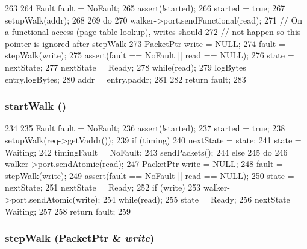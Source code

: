 \begin{DoxyCode}
263 {
264     Fault fault = NoFault;
265     assert(!started);
266     started = true;
267     setupWalk(addr);
268 
269     do {
270         walker->port.sendFunctional(read);
271         // On a functional access (page table lookup), writes should
272         // not happen so this pointer is ignored after stepWalk
273         PacketPtr write = NULL;
274         fault = stepWalk(write);
275         assert(fault == NoFault || read == NULL);
276         state = nextState;
277         nextState = Ready;
278     } while(read);
279     logBytes = entry.logBytes;
280     addr = entry.paddr;
281 
282     return fault;
283 }
\end{DoxyCode}
\hypertarget{classX86ISA_1_1Walker_1_1WalkerState_abe41f563c4251c8a075c343d770369ac}{
\subsubsection[{startWalk}]{ startWalk ()}}
\label{classX86ISA_1_1Walker_1_1WalkerState_abe41f563c4251c8a075c343d770369ac}



\begin{DoxyCode}
234 {
235     Fault fault = NoFault;
236     assert(!started);
237     started = true;
238     setupWalk(req->getVaddr());
239     if (timing) {
240         nextState = state;
241         state = Waiting;
242         timingFault = NoFault;
243         sendPackets();
244     } else {
245         do {
246             walker->port.sendAtomic(read);
247             PacketPtr write = NULL;
248             fault = stepWalk(write);
249             assert(fault == NoFault || read == NULL);
250             state = nextState;
251             nextState = Ready;
252             if (write)
253                 walker->port.sendAtomic(write);
254         } while(read);
255         state = Ready;
256         nextState = Waiting;
257     }
258     return fault;
259 }
\end{DoxyCode}
\hypertarget{classX86ISA_1_1Walker_1_1WalkerState_a5c46b5cda98378cdb854f6810ee91f8a}{
\subsubsection[{stepWalk}]{ stepWalk ({\bf PacketPtr} \& {\em write})}}
\label{classX86ISA_1_1Walker_1_1WalkerState_a5c46b5cda98378cdb854f6810ee91f8a}



